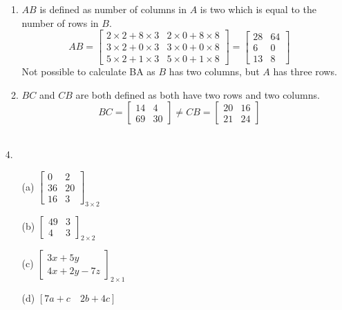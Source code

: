 \begin{enumerate}
\begin{enumerate}
\item $A B$ is defined as number of columns in $A$ is two which is equal to the number of rows in $B$.
\[
A B=\left[\begin{array}{cc}
2 \times 2+8 \times 3 & 2 \times 0+8 \times 8 \\
3 \times 2+0 \times 3 & 3 \times 0+0 \times 8 \\
5 \times 2+1 \times 3 & 5 \times 0+1 \times 8
\end{array}\right]=\left[\begin{array}{cc}
28 & 64 \\
6 & 0 \\
13 & 8
\end{array}\right]
\]
Not possible to calculate BA as $B$ has two columns, but $A$ has three rows.

\item $B C$ and $C B$ are both defined as both have two rows and two columns.
\[
B C=\left[\begin{array}{ll}
14 & 4 \\
69 & 30
\end{array}\right] \neq C B=\left[\begin{array}{cc}
20 & 16 \\
21 & 24
\end{array}\right]
\] \\
\end{enumerate} 

\item[4.]
\begin{multicols}{2}
\begin{enumerate}\renewcommand{\labelenumi}{\alph{enumi})}
\item [(a)] $\left[\begin{array}{cc}0 & 2 \\ 36 & 20 \\ 16 & 3\end{array}\right]_{3 \times 2}$
\item [(b)] $\left[\begin{array}{ll}49 & 3 \\ 4 & 3\end{array}\right]_{2 \times 2}$
\item [(c)] $\left[\begin{array}{l}3 x+5 y \\ 4 x+2 y-7 z\end{array}\right]_{2 \times 1}$ 
\item [(d)] $[7 a+c \quad 2 b+4 c]$ \\~\\
\end{enumerate}
\end{multicols}
\end{enumerate} 


